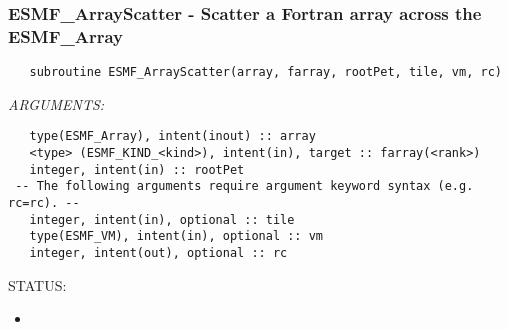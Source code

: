  
\setlength{\oldparskip}{\parskip}
\setlength{\parskip}{1.5ex}
\setlength{\oldparindent}{\parindent}
\setlength{\parindent}{0pt}
\setlength{\oldbaselineskip}{\baselineskip}
\setlength{\baselineskip}{11pt}
 
\def\bv{\begin{verbatim}}
\def\ev{\end{verbatim}}
\def\be{\begin{equation}}
\def\ee{\end{equation}}
\def\bea{\begin{eqnarray}}
\def\eea{\end{eqnarray}}
\def\bi{\begin{itemize}}
\def\ei{\end{itemize}}
\def\bn{\begin{enumerate}}
\def\en{\end{enumerate}}
\def\bd{\begin{description}}
\def\ed{\end{description}}
\def\({\left (}
\def\){\right )}
\def\[{\left [}
\def\]{\right ]}
\def\<{\left  \langle}
\def\>{\right \rangle}
\def\cI{{\cal I}}
\def\diag{\mathop{\rm diag}}
\def\tr{\mathop{\rm tr}}


 

   \subsubsection [ESMF\_ArrayScatter] {ESMF\_ArrayScatter - Scatter a Fortran array across the ESMF\_Array }


   
\begin{verbatim}   subroutine ESMF_ArrayScatter(array, farray, rootPet, tile, vm, rc) 
   \end{verbatim}{\em ARGUMENTS:}
\begin{verbatim}   type(ESMF_Array), intent(inout) :: array 
   <type> (ESMF_KIND_<kind>), intent(in), target :: farray(<rank>) 
   integer, intent(in) :: rootPet 
 -- The following arguments require argument keyword syntax (e.g. rc=rc). --
   integer, intent(in), optional :: tile 
   type(ESMF_VM), intent(in), optional :: vm 
   integer, intent(out), optional :: rc 
   \end{verbatim}
{\sf STATUS:}
   \begin{itemize} 
   \item{} 
   \end{itemize} 
   
